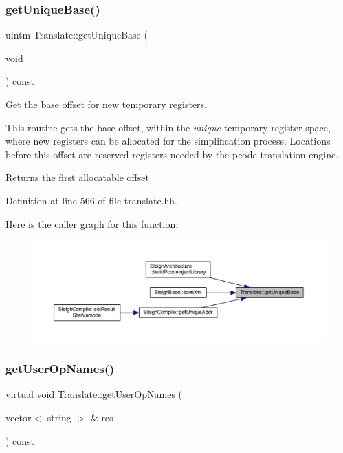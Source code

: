 \subsubsection{\texorpdfstring{getUniqueBase()}{getUniqueBase()}}
{\footnotesize\ttfamily uintm Translate\+::get\+Unique\+Base (\begin{DoxyParamCaption}\item[{void}]{ }\end{DoxyParamCaption}) const\hspace{0.3cm}{\ttfamily [inline]}}



Get the base offset for new temporary registers. 

This routine gets the base offset, within the {\itshape unique} temporary register space, where new registers can be allocated for the simplification process. Locations before this offset are reserved registers needed by the pcode translation engine. \begin{DoxyReturn}{Returns}
the first allocatable offset 
\end{DoxyReturn}


Definition at line 566 of file translate.\+hh.

Here is the caller graph for this function\+:
\nopagebreak
\begin{figure}[H]
\begin{center}
\leavevmode
\includegraphics[width=350pt]{class_translate_a5373fc652ce0b12cd646e4d4befbea25_icgraph}
\end{center}
\end{figure}
\mbox{\label{class_translate_a2475ba8a71e0d514903b3b5458e6cf45}} 
\subsubsection{\texorpdfstring{getUserOpNames()}{getUserOpNames()}}
{\footnotesize\ttfamily virtual void Translate\+::get\+User\+Op\+Names (\begin{DoxyParamCaption}\item[{vector$<$ string $>$ \&}]{res }\end{DoxyParamCaption}) const\hspace{0.3cm}{\ttfamily [pure virtual]}}



